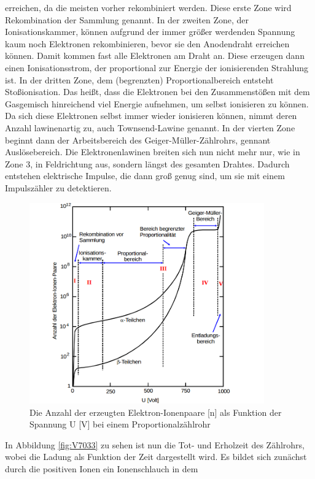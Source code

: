 \documentclass[
  bibliography=totoc,     %
  captions=tableheading,  %
  titlepage=firstiscover, %
]{scrartcl}
\begin{document}
erreichen, da die meisten vorher rekombiniert werden. Diese erste Zone wird
Rekombination der Sammlung genannt. In der zweiten Zone, der
Ionisationskammer, können aufgrund der immer größer werdenden Spannung kaum noch
Elektronen rekombinieren, bevor sie den Anodendraht erreichen können. Damit
kommen fast alle Elektronen am Draht an. Diese erzeugen dann einen
Ionisationsstrom, der proportional zur Energie der ionisierenden Strahlung ist.
In der dritten Zone, dem (begrenzten) Proportionalbereich entsteht Stoßionisation.
Das heißt, dass die Elektronen bei den Zusammenstößen mit dem Gasgemisch
hinreichend viel Energie aufnehmen, um selbst ionisieren zu können. Da sich diese
Elektronen selbst immer wieder ionisieren können, nimmt deren Anzahl lawinenartig
zu, auch Townsend-Lawine genannt. In der vierten Zone beginnt dann der
Arbeitsbereich des Geiger-Müller-Zählrohrs, gennant Auslösebereich. Die
Elektronenlawinen breiten sich nun nicht mehr nur, wie in Zone 3, in Feldrichtung
aus, sondern längst des gesamten Drahtes. Dadurch entstehen elektrische
Impulse, die dann groß genug sind, um sie mit einem Impulszähler zu detektieren.
\begin{figure}[htb]
  \centering
  \includegraphics[width=0.9\textwidth]{V7032.png}
  \caption{Die Anzahl der erzeugten Elektron-Ionenpaare [n] als Funktion der
  Spannung U [V] bei einem Proportionalzählrohr}
  \label{fig:V7032}
\end{figure}
In Abbildung \ref{fig:V7033} zu sehen ist nun die Tot- und Erholzeit des
Zählrohrs, wobei die Ladung als Funktion der Zeit dargestellt wird.
Es bildet sich zunächst durch die positiven Ionen ein Ionenschlauch in dem
\end{document}
